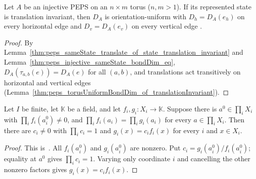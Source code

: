 \begin{corollary}%
    \label{cor:peps_state_translation_bond_uniform}
    \leanok
    Let $A$ be an injective PEPS on an $n\times m$ torus ($n,m>1$). If its
    represented state is translation invariant, then $D_A$ is
    orientation-uniform with $D_h=D_A(e_h)$ on every horizontal edge and
    $D_v=D_A(e_v)$ on every vertical edge
    \cite[lines~1891--1894]{Molnar2018NormalPEPS}.
\end{corollary}
\begin{proof}\leanok
    By Lemma~\ref{thm:peps_sameState_translate_of_state_translation_invariant}
    and Lemma~\ref{thm:peps_injective_sameState_bondDim_eq},
    $D_A(\tau_{a,b}(e))=D_A(e)$ for all $(a,b)$, and translations act
    transitively on horizontal and vertical edges
    (Lemma~\ref{thm:peps_torusUniformBondDim_of_translationInvariant}).
\end{proof}

\begin{lemma}%
    \label{thm:peps_product_factor_uniqueness}
    \leanok
    Let $I$ be finite, let $\mathbb K$ be a field, and let
    $f_i,g_i:X_i\to\mathbb K$. Suppose there is $a^0\in\prod_iX_i$
    with $\prod_i f_i(a_i^0)\ne0$, and
    $\prod_i f_i(a_i)=\prod_i g_i(a_i)$ for every $a\in\prod_iX_i$.
    Then there are $c_i\ne0$ with $\prod_i c_i=1$ and
    $g_i(x)=c_i f_i(x)$ for every $i$ and $x\in X_i$.
\end{lemma}
\begin{proof}\leanok
    This is~\cite[``Uniqueness of finite product
        factors'']{QICLean2026Blueprint}.
    All $f_i(a_i^0)$ and $g_i(a_i^0)$ are nonzero. Put
    $c_i=g_i(a_i^0)/f_i(a_i^0)$; equality at $a^0$ gives
    $\prod_i c_i=1$. Varying only coordinate $i$ and cancelling the
    other nonzero factors gives $g_i(x)=c_i f_i(x)$.
\end{proof}

